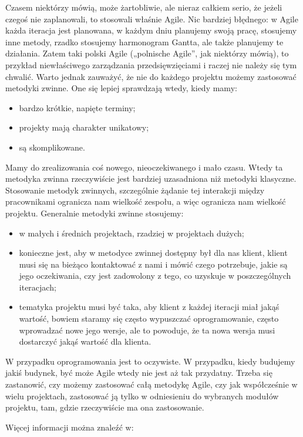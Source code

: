 Czasem niektórzy mówią, może żartobliwie, ale nieraz całkiem serio, że jeżeli czegoś nie zaplanowali, to stosowali właśnie Agile. Nic bardziej błędnego: w Agile każda iteracja jest planowana, w każdym dniu planujemy swoją pracę, stosujemy inne metody, rzadko stosujemy harmonogram Gantta, ale także planujemy te działania. Zatem taki polski Agile („polnische Agile”, jak niektórzy mówią), to przykład niewłaściwego zarządzania przedsięwzięciami i raczej nie należy się tym chwalić.
Warto jednak zauważyć, że nie do każdego projektu możemy zastosować metodyki zwinne. One się lepiej sprawdzają wtedy, kiedy mamy:
\begin{itemize}
	\item bardzo krótkie, napięte terminy;
	\item projekty mają charakter unikatowy;
	\item są skomplikowane.
\end{itemize}

Mamy do zrealizowania coś nowego, nieoczekiwanego i mało czasu. Wtedy ta metodyka zwinna rzeczywiście jest bardziej uzasadniona niż metodyki klasyczne. Stosowanie metodyk zwinnych, szczególnie żądanie tej interakcji między pracownikami ogranicza nam wielkość zespołu, a więc ogranicza nam wielkość projektu. Generalnie metodyki zwinne stosujemy:
\begin{itemize}
	\item w małych i średnich projektach, rzadziej w projektach dużych;
	\item konieczne jest, aby w metodyce zwinnej dostępny był dla nas klient, klient musi się na bieżąco kontaktować z nami i mówić czego potrzebuje, jakie są jego oczekiwania, czy jest zadowolony z tego, co uzyskuje w poszczególnych iteracjach;

	\item tematyka projektu musi być taka, aby klient z każdej iteracji miał jakąś wartość, bowiem staramy się często wypuszczać oprogramowanie, często wprowadzać nowe jego wersje, ale to powoduje, że ta nowa wersja musi dostarczyć jakąś wartość dla klienta.
\end{itemize}
W przypadku oprogramowania jest to oczywiste. W przypadku, kiedy budujemy jakiś budynek, być może Agile wtedy nie jest aż tak przydatny. Trzeba się zastanowić, czy możemy zastosować całą metodykę Agile, czy jak współcześnie w wielu projektach, zastosować ją tylko w odniesieniu do wybranych modułów projektu, tam, gdzie rzeczywiście ma ona zastosowanie.

Więcej informacji można znaleźć w:\cite{Cohen_2006}